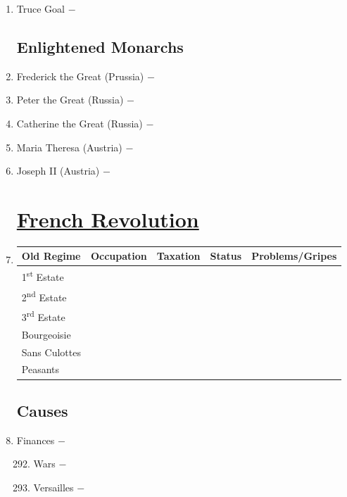 \documentclass[12pt]{article}
\begin{document}
\begin{enumerate}
\item Truce Goal $-$

\subsection{Enlightened Monarchs}

\item Frederick the Great (Prussia) $-$ 

\item Peter the Great (Russia) $-$

\item Catherine the Great (Russia) $-$ 

\item Maria Theresa (Austria) $-$ 

\item Joseph II (Austria) $-$


\section{\underline{French Revolution}} 

\item \begin{tabular}{l c c c c}

Old Regime & Occupation & Taxation & Status & Problems/Gripes\\
\hline
1\textsuperscript{st} Estate & & & & \\
\hline
2\textsuperscript{nd} Estate & & & & \\
\hline
3\textsuperscript{rd} Estate & & & & \\
\hline
Bourgeoisie & & & & \\
\hline
Sans Culottes & & & & \\
\hline
Peasants & & & & \\
\hline

\end{tabular}

\subsection{Causes}

\item Finances $-$

\begin{enumerate}[label=\arabic{*}.]
\setcounter{enumii}{291}

\item Wars $-$

\item Versailles $-$


\end{enumerate}
\end{enumerate}
\end{document}
